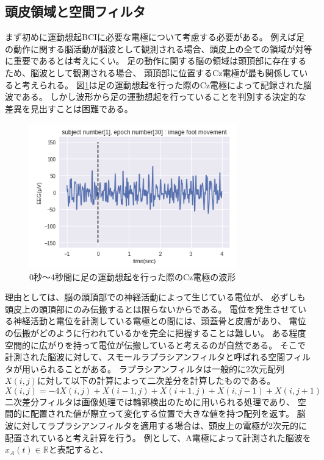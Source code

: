 \subsection{頭皮領域と空間フィルタ}
まず初めに運動想起BCIに必要な電極について考慮する必要がある。
例えば足の動作に関する脳活動が脳波として観測される場合、頭皮上の全ての領域が対等に重要であるとは考えにくい。
足の動作に関する脳の領域は頭頂部に存在するため、脳波として観測される場合、
頭頂部に位置するCz電極が最も関係していると考えられる。
図\ref{fig:Cz}は足の運動想起を行った際のCz電極によって記録された脳波である。
しかし波形から足の運動想起を行っていることを判別する決定的な差異を見出すことは困難である。
\begin{figure}[t]
    \centering
    \includegraphics[width=9cm]{images/CzEEG.png}
    \caption{0秒〜4秒間に足の運動想起を行った際のCz電極の波形}
    \label{fig:Cz}
\end{figure}
理由としては、脳の頭頂部での神経活動によって生じている電位が、
必ずしも頭皮上の頭頂部にのみ伝搬するとは限らないからである。
電位を発生させている神経活動と電位を計測している電極との間には、頭蓋骨と皮膚があり、
電位の伝搬がどのように行われているかを完全に把握することは難しい。
ある程度空間的に広がりを持って電位が伝搬していると考えるのが自然である。
そこで計測された脳波に対して、スモールラプラシアンフィルタと呼ばれる空間フィルタが用いられることがある。
ラプラシアンフィルタは一般的に2次元配列\(X(i,j)\)に対して以下の計算によって二次差分を計算したものである。
\begin{equation}
    X(i,j) = -4X(i,j) + X(i-1,j) + X(i+1,j) + X(i,j-1) + X(i,j+1)
\end{equation}
二次差分フィルタは画像処理では輪郭検出のために用いられる処理であり、
空間的に配置された値が際立って変化する位置で大きな値を持つ配列を返す。
脳波に対してラプラシアンフィルタを適用する場合は、頭皮上の電極が2次元的に配置されていると考え計算を行う。
例として、A電極によって計測された脳波を\(x_A(t) \in \mathbb R\)と表記すると、
